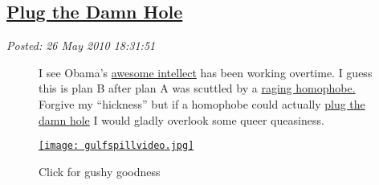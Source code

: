 %

\subsection*{\href{https://bakerjd99.wordpress.com/2010/05/26/plug-the-damn-hole/}{Plug the Damn Hole}}


\noindent\emph{Posted: 26 May 2010 18:31:51}
\vspace{6pt}

\captionsetup[figure]{labelformat=empty}
\begin{figure}[ht]
\begin{minipage}[b]{0.50\textwidth}
\setlength{\parindent}{\minindent}
I see Obama's \href{http://www.youtube.com/watch?v=PKx1C0gY6Qk}{awesome
intellect} has been working overtime. I guess this is plan B after plan
A was scuttled by a \href{http://metroweekly.com/news/?ak=5208}{raging
homophobe.} Forgive my ``hickness'' but if a homophobe could actually
\href{http://thehill.com/blogs/blog-briefing-room/news/99713-obama-to-aides-plug-the-damn-hole?page=46}{plug
the damn hole} I would gladly overlook some queer queasiness.
\end{minipage}
\hspace{1pt}
\begin{minipage}[b]{0.40\textwidth}
\centering
\href{http://www.youtube.com/watch?v=rlPPFcy-3Vo}{\texttt{[image: gulfspillvideo.jpg]}}
\caption{Click for gushy goodness}
\label{fig:gulfspill}
\end{minipage}
\end{figure}




%